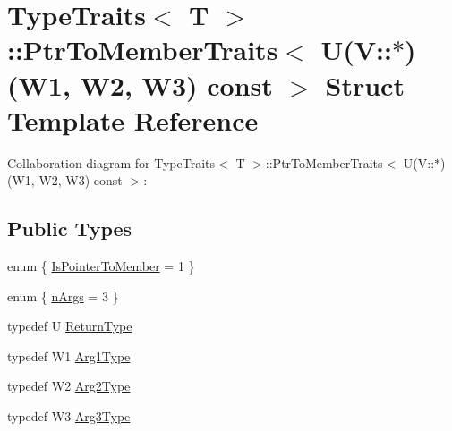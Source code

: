 \hypertarget{structTypeTraits_1_1PtrToMemberTraits_3_01U_07V_1_1_5_08_07W1_00_01W2_00_01W3_08_01const_01_01_4}{}\section{Type\+Traits$<$ T $>$\+:\+:Ptr\+To\+Member\+Traits$<$ U(V\+:\+:$\ast$)(W1, W2, W3) const $>$ Struct Template Reference}
\label{structTypeTraits_1_1PtrToMemberTraits_3_01U_07V_1_1_5_08_07W1_00_01W2_00_01W3_08_01const_01_01_4}


Collaboration diagram for Type\+Traits$<$ T $>$\+:\+:Ptr\+To\+Member\+Traits$<$ U(V\+:\+:$\ast$)(W1, W2, W3) const $>$\+:
\subsection*{Public Types}
\begin{DoxyCompactItemize}
\item 
enum \{ \hyperlink{structTypeTraits_1_1PtrToMemberTraits_3_01U_07V_1_1_5_08_07W1_00_01W2_00_01W3_08_01const_01_01_4_ad3b825b2f5f0118b1b56020327992314a6762629d9ef8d2c35cd60351a1282ff3}{Is\+Pointer\+To\+Member} = 1
 \}
\item 
enum \{ \hyperlink{structTypeTraits_1_1PtrToMemberTraits_3_01U_07V_1_1_5_08_07W1_00_01W2_00_01W3_08_01const_01_01_4_aee45640458aee1c1fc72605f345cf1d5af9629127792133406ec2e56fb81b209d}{n\+Args} = 3
 \}
\item 
typedef U \hyperlink{structTypeTraits_1_1PtrToMemberTraits_3_01U_07V_1_1_5_08_07W1_00_01W2_00_01W3_08_01const_01_01_4_af5e6f2b3ff5bfb9bc84d7e50f3c6217b}{Return\+Type}
\item 
typedef W1 \hyperlink{structTypeTraits_1_1PtrToMemberTraits_3_01U_07V_1_1_5_08_07W1_00_01W2_00_01W3_08_01const_01_01_4_a25e4fcf3c2294ffa0bd6a26a76713ffb}{Arg1\+Type}
\item 
typedef W2 \hyperlink{structTypeTraits_1_1PtrToMemberTraits_3_01U_07V_1_1_5_08_07W1_00_01W2_00_01W3_08_01const_01_01_4_a3e2f96cf6ac6cf96b374d0ee8fdd3e67}{Arg2\+Type}
\item 
typedef W3 \hyperlink{structTypeTraits_1_1PtrToMemberTraits_3_01U_07V_1_1_5_08_07W1_00_01W2_00_01W3_08_01const_01_01_4_a0617216c754a6233c227d02ded60e0bf}{Arg3\+Type}
\end{DoxyCompactItemize}



